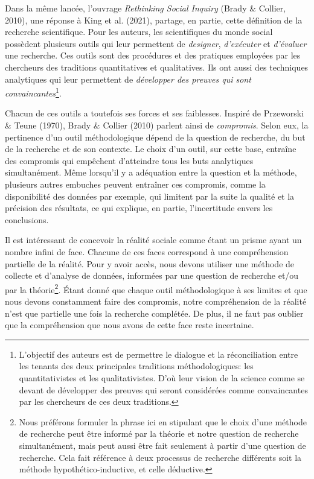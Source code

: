\documentclass[
  letterpaper,
  DIV=11,
  numbers=noendperiod]{scrreprt}
\begin{document}
Dans la même lancée, l'ouvrage \emph{Rethinking Social Inquiry} (Brady
\& Collier, 2010), une réponse à King et al. (2021), partage, en partie,
cette définition de la recherche scientifique. Pour les auteurs, les
scientifiques du monde social possèdent plusieurs outils qui leur
permettent de \emph{designer}, \emph{d'exécuter} et \emph{d'évaluer} une
recherche. Ces outils sont des procédures et des pratiques employées par
les chercheurs des traditions quantitatives et qualitatives. Ils ont
aussi des techniques analytiques qui leur permettent de \emph{développer
des preuves qui sont convaincantes}\footnote{L'objectif des auteurs est
  de permettre le dialogue et la réconciliation entre les tenants des
  deux principales traditions méthodologiques: les quantitativistes et
  les qualitativistes. D'où leur vision de la science comme se devant de
  développer des preuves qui seront considérées comme convaincantes par
  les chercheurs de ces deux traditions.}.

Chacun de ces outils a toutefois ses forces et ses faiblesses. Inspiré
de Przeworski \& Teune (1970), Brady \& Collier (2010) parlent ainsi de
\emph{compromis}. Selon eux, la pertinence d'un outil méthodologique
dépend de la question de recherche, du but de la recherche et de son
contexte. Le choix d'un outil, sur cette base, entraîne des compromis
qui empêchent d'atteindre tous les buts analytiques simultanément. Même
lorsqu'il y a adéquation entre la question et la méthode, plusieurs
autres embuches peuvent entraîner ces compromis, comme la disponibilité
des données par exemple, qui limitent par la suite la qualité et la
précision des résultats, ce qui explique, en partie, l'incertitude
envers les conclusions.

Il est intéressant de concevoir la réalité sociale comme étant un prisme
ayant un nombre infini de face. Chacune de ces faces correspond à une
compréhension partielle de la réalité. Pour y avoir accès, nous devons
utiliser une méthode de collecte et d'analyse de données, informées par
une question de recherche et/ou par la théorie\footnote{Nous préférons
  formuler la phrase ici en stipulant que le choix d'une méthode de
  recherche peut être informé par la théorie et notre question de
  recherche simultanément, mais peut aussi être fait seulement à partir
  d'une question de recherche. Cela fait référence à deux processus de
  recherche différents soit la méthode hypothético-inductive, et celle
  déductive.}. Étant donné que chaque outil méthodologique à ses limites
et que nous devons constamment faire des compromis, notre compréhension
de la réalité n'est que partielle une fois la recherche complétée. De
plus, il ne faut pas oublier que la compréhension que nous avons de
cette face reste incertaine.
\end{document}
